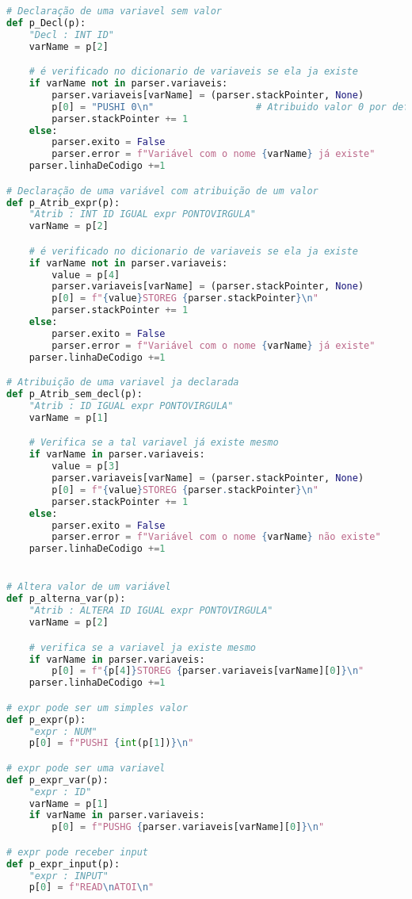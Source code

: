 \documentclass[11pt,a4paper]{report}
\begin{document}
\begin{scriptsize}
\begin{lstlisting}[language=python]
# Declaração de uma variavel sem valor
def p_Decl(p):
    "Decl : INT ID"
    varName = p[2]

    # é verificado no dicionario de variaveis se ela ja existe
    if varName not in parser.variaveis:
        parser.variaveis[varName] = (parser.stackPointer, None)
        p[0] = "PUSHI 0\n"                  # Atribuido valor 0 por definição
        parser.stackPointer += 1
    else:
        parser.exito = False
        parser.error = f"Variável com o nome {varName} já existe"
    parser.linhaDeCodigo +=1

# Declaração de uma variável com atribuição de um valor
def p_Atrib_expr(p):
    "Atrib : INT ID IGUAL expr PONTOVIRGULA"
    varName = p[2]

    # é verificado no dicionario de variaveis se ela ja existe
    if varName not in parser.variaveis:
        value = p[4]
        parser.variaveis[varName] = (parser.stackPointer, None)
        p[0] = f"{value}STOREG {parser.stackPointer}\n"
        parser.stackPointer += 1
    else:
        parser.exito = False
        parser.error = f"Variável com o nome {varName} já existe"
    parser.linhaDeCodigo +=1

# Atribuição de uma variavel ja declarada
def p_Atrib_sem_decl(p):
    "Atrib : ID IGUAL expr PONTOVIRGULA"
    varName = p[1]

    # Verifica se a tal variavel já existe mesmo
    if varName in parser.variaveis:
        value = p[3]
        parser.variaveis[varName] = (parser.stackPointer, None)
        p[0] = f"{value}STOREG {parser.stackPointer}\n"
        parser.stackPointer += 1
    else:
        parser.exito = False
        parser.error = f"Variável com o nome {varName} não existe"
    parser.linhaDeCodigo +=1


# Altera valor de um variável
def p_alterna_var(p):
    "Atrib : ALTERA ID IGUAL expr PONTOVIRGULA"
    varName = p[2]

    # verifica se a variavel ja existe mesmo
    if varName in parser.variaveis:
        p[0] = f"{p[4]}STOREG {parser.variaveis[varName][0]}\n"
    parser.linhaDeCodigo +=1

# expr pode ser um simples valor
def p_expr(p):
    "expr : NUM"
    p[0] = f"PUSHI {int(p[1])}\n"

# expr pode ser uma variavel
def p_expr_var(p):
    "expr : ID"
    varName = p[1]
    if varName in parser.variaveis:
        p[0] = f"PUSHG {parser.variaveis[varName][0]}\n"

# expr pode receber input
def p_expr_input(p):
    "expr : INPUT"
    p[0] = f"READ\nATOI\n"



\end{lstlisting}
\end{scriptsize}
\end{document}
